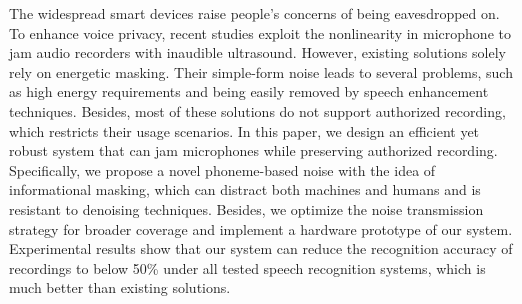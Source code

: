 The widespread smart devices raise people's concerns of being eavesdropped on.
% 
To enhance voice privacy, recent studies exploit the nonlinearity in microphone to jam audio recorders with inaudible ultrasound.
% 
However, existing solutions solely rely on energetic masking. Their simple-form noise leads to several problems, such as high energy requirements and being easily removed by speech enhancement techniques. Besides, most of these solutions do not support authorized recording, which restricts their usage scenarios.
% 
In this paper, we design an efficient yet robust system that can jam microphones while preserving authorized recording.
Specifically, we propose a novel phoneme-based noise with the idea of informational masking, which can distract both machines and humans and is resistant to denoising techniques. 
Besides, we optimize the noise transmission strategy for broader coverage and implement a hardware prototype of our system.
% 
Experimental results show that our system can reduce the recognition accuracy of recordings to below 50\% under all tested speech recognition systems, which is much better than existing solutions.
